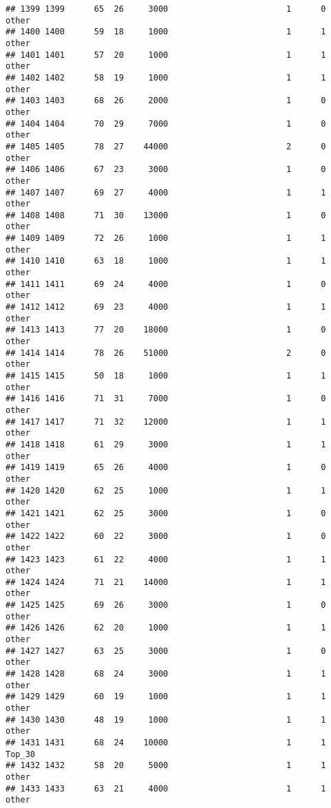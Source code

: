 \documentclass[
]{article}
\begin{document}
\begin{verbatim}
## 1399 1399      65  26     3000                        1      0    other
## 1400 1400      59  18     1000                        1      1    other
## 1401 1401      57  20     1000                        1      1    other
## 1402 1402      58  19     1000                        1      1    other
## 1403 1403      68  26     2000                        1      0    other
## 1404 1404      70  29     7000                        1      0    other
## 1405 1405      78  27    44000                        2      0    other
## 1406 1406      67  23     3000                        1      0    other
## 1407 1407      69  27     4000                        1      1    other
## 1408 1408      71  30    13000                        1      0    other
## 1409 1409      72  26     1000                        1      1    other
## 1410 1410      63  18     1000                        1      1    other
## 1411 1411      69  24     4000                        1      0    other
## 1412 1412      69  23     4000                        1      1    other
## 1413 1413      77  20    18000                        1      0    other
## 1414 1414      78  26    51000                        2      0    other
## 1415 1415      50  18     1000                        1      1    other
## 1416 1416      71  31     7000                        1      0    other
## 1417 1417      71  32    12000                        1      1    other
## 1418 1418      61  29     3000                        1      1    other
## 1419 1419      65  26     4000                        1      0    other
## 1420 1420      62  25     1000                        1      1    other
## 1421 1421      62  25     3000                        1      0    other
## 1422 1422      60  22     3000                        1      0    other
## 1423 1423      61  22     4000                        1      1    other
## 1424 1424      71  21    14000                        1      1    other
## 1425 1425      69  26     3000                        1      0    other
## 1426 1426      62  20     1000                        1      1    other
## 1427 1427      63  25     3000                        1      0    other
## 1428 1428      68  24     3000                        1      1    other
## 1429 1429      60  19     1000                        1      1    other
## 1430 1430      48  19     1000                        1      1    other
## 1431 1431      68  24    10000                        1      1   Top_30
## 1432 1432      58  20     5000                        1      1    other
## 1433 1433      63  21     4000                        1      1    other

\end{verbatim}
\end{document}
